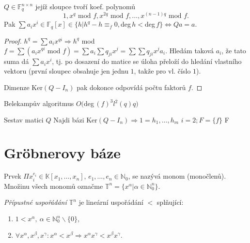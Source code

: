 \begin{claim}
    $Q\in\mathbb{F}_q^{n\times n}$ jejíž sloupce tvoří koef. polynomů
    \[
        1, x^q \text{ mod } f,x^{2q} \text{ mod } f,\dots,x^{(n-1)q} \text{ mod } f.
    \]
    Pak $\sum a_ix^i \in \mathbb{F}_q[x] \in \{h|h^q-h\equiv_f 0, $deg$\,h<$deg$\,f\} \Leftrightarrow Qa=a$.
    \begin{proof}
        $h^q=\sum a_ix^{qi}\Rightarrow h^q$ mod $f=\sum (a_ix^{qi} \text{ mod }f)=\sum a_i\sum q_{ji}x^j=\sum\sum q_{ji}x^ja_i$. Hledám taková $a_i$, že tato suma dá $\sum a_ix^i$, tj. po dosazení do matice se úloha přeloží do hledání vlastního vektoru (první sloupec obsahuje jen jednu $1$, takže pro vl. číslo $1$).

        Dimenze Ker$(Q-I_n)$ pak dokonce odpovídá počtu faktorů $f$.
    \end{proof}
\end{claim}

\begin{algorithm}
    \caption{Belekampův algoritmus $O($deg$\,(f)^3l^2(q)q)$}
    Sestav matici $Q$\;
    Najdi bázi Ker$(Q-I_n) \Rightarrow 1=h_1,\dots,h_m$\;
    $i=2;F=\{f\}$\;
    \Return F
    \vspace{0.2cm}
\end{algorithm}

\section*{Gröbnerovy báze}

\begin{defn}[Monom]
    Prvek $\Pi x_i^{e_i}\in \mathbb{K}[x_1,\dots,x_n],\, e_1,\dots,e_n\in\mathbb{N}_0$, se nazývá monom (monočlenů). Množinu všech monomů označme $\mathbb{T}^n=\{x^\alpha|\alpha\in\mathbb{N}_0^n\}$.
\end{defn}

\begin{defn}[]
    \textit{Přípustné uspořádání $\mathbb{T}^n$} je lineární uspořádání $<$ splňující:
    \begin{enumerate}
        \item $1<x^\alpha,\ \alpha \in \mathbb{N}_0^n\backslash\{0\}$,
        \item $\forall x^\alpha, x^\beta, x^\gamma:x^\alpha<x^\beta \Rightarrow x^\alpha x^\gamma < x^\beta x^\gamma$.
    \end{enumerate}
\end{defn}

